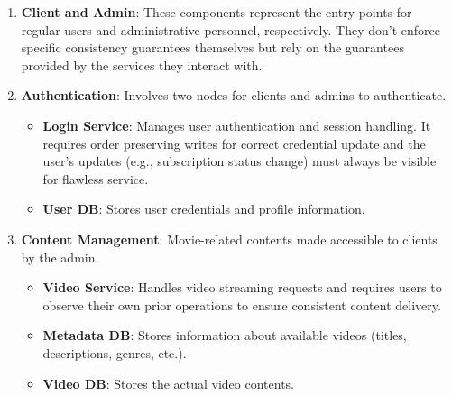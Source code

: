 \begin{enumerate}[leftmargin=*,noitemsep,topsep=2pt]
  \item \textbf{Client and Admin}: These components represent the
    entry points for regular users and administrative personnel,
    respectively. They don't enforce specific consistency guarantees
    themselves but rely on the guarantees provided by the services
    they interact with.

  \item \textbf{Authentication}: Involves two nodes for clients and admins to authenticate.
    \begin{itemize}[leftmargin=*, noitemsep,topsep=0pt]
      \item \textbf{Login Service}: Manages user authentication and
        session handling. It requires order preserving writes
        for correct credential update and the user's updates
        (e.g., subscription status change) must always be visible for
        flawless service.
      \item \textbf{User DB}: Stores user credentials and
        profile information.
    \end{itemize}

  \item \textbf{Content Management}: Movie-related contents made accessible to clients by the admin.
    \begin{itemize}[leftmargin=*, noitemsep,topsep=0pt]
      \item \textbf{Video Service}: Handles video streaming requests
        and requires users to observe their own prior operations to ensure
        consistent content delivery.
      \item \textbf{Metadata DB}: Stores information about
        available videos (titles, descriptions, genres, etc.).
      \item \textbf{Video DB}: Stores the actual video contents.
    \end{itemize}


\end{enumerate}

